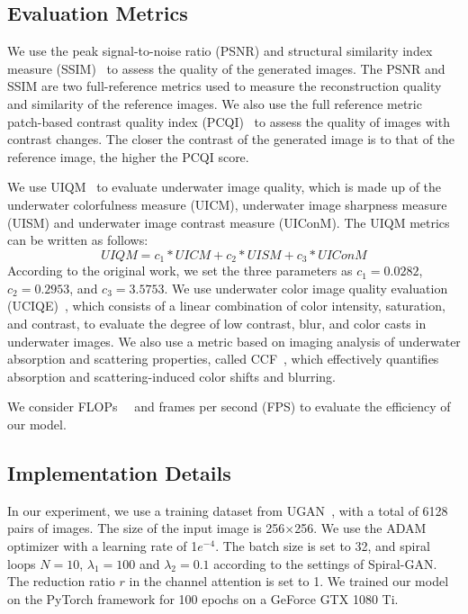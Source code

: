 \documentclass[utf8]{FrontiersinHarvard} %
\begin{document}
\subsection{Evaluation Metrics}
We use the peak signal-to-noise ratio (PSNR) and structural similarity index measure (SSIM)~\citep{A2010Image} to assess the quality of the generated images. The PSNR and SSIM are two full-reference metrics used to measure the reconstruction quality and similarity of the reference images. {We also use the full reference metric patch-based contrast quality index (PCQI)~\citep{wang2015patch} to assess the quality of images with contrast changes. The closer the contrast of the generated image is to that of the reference image, the higher the PCQI score.
} 

We use UIQM~\citep{7305804} to evaluate underwater image quality, which is made up of the underwater colorfulness measure (UICM), underwater image sharpness measure (UISM) and underwater image contrast measure (UIConM). The UIQM metrics can be written as follows:
\begin{equation}
UIQM = c_{1}*UICM + c_{2}*UISM + c_{3}*UIConM
\label{con:UIQM}
\end{equation}
According to the original work, we set the three parameters as $c_{1}=0.0282$, $c_{2}=0.2953$, and $c_{3}=3.5753$. {
We use underwater color image quality evaluation (UCIQE)~\citep{yang2015underwater}, which consists of a linear combination of color intensity, saturation, and contrast, to evaluate the degree of low contrast, blur, and color casts in underwater images. We also use a metric based on imaging analysis of underwater absorption and scattering properties, called CCF~\citep{wang2018imaging}, which effectively quantifies absorption and scattering-induced color shifts and blurring.}

We consider FLOPs~\citep{2016Deep}~\citep{2019EfficientNet} and frames per second (FPS) to evaluate the efficiency of our model. 

\subsection{Implementation Details}
In our experiment, we use a training dataset from UGAN~\citep{8460552}, with a total of 6128 pairs of images. The size of the input image is 256$\times$256. We use the ADAM optimizer with a learning rate of 1$e^{-4}$. The batch size is set to 32, and spiral loops $N=10$, $\lambda_{1}=100$ and $\lambda_{2}=0.1$ according to the settings of Spiral-GAN. The reduction ratio $r$ in the channel attention is set to 1. We trained our model on the PyTorch framework for 100 epochs on a GeForce GTX 1080 Ti.
\end{document}
